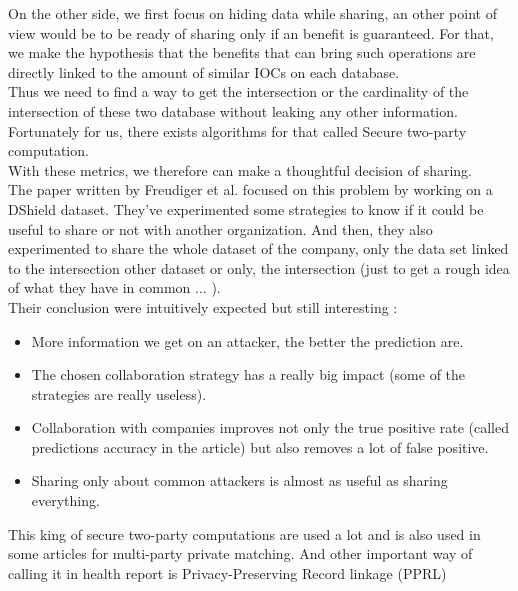 \documentclass{eplmastersthesis}
\begin{document}
On the other side, we first focus on hiding data while sharing, an other point of view would be to be ready of sharing only if an benefit is guaranteed. For that, we make the hypothesis that the benefits that can bring such operations are directly linked to the amount of similar IOCs on each database.\\
Thus we need to find a way to get the intersection or the cardinality of the intersection of these two database without leaking any other information. Fortunately for us, there exists algorithms for that called Secure two-party computation.\\
With these metrics, we therefore can make a thoughtful decision of sharing.\\
The paper written by Freudiger et al.\cite{freudiger2015controlled} focused on this problem by working on a DShield dataset. They've experimented some strategies to know if it could be useful to share or not with another organization. And then, they also experimented to share the whole dataset of the company, only the data set linked to the intersection other dataset or only, the intersection (just to get a rough idea of what they have in common ... ).\\
Their conclusion were intuitively expected but still interesting :
\begin{itemize}
\item More information we get on an attacker, the better the prediction are.
\item The chosen collaboration strategy has a really big impact (some of the strategies are really useless).
\item Collaboration with companies improves not only the true positive rate (called predictions accuracy in the article) but also removes a lot of false positive.
\item Sharing only about common attackers is almost as useful as sharing everything.
\end{itemize}

This king of secure two-party computations are used a lot and is also used in some articles for multi-party private matching. And other important way of calling it in health report is Privacy-Preserving Record linkage (PPRL)
\end{document}
